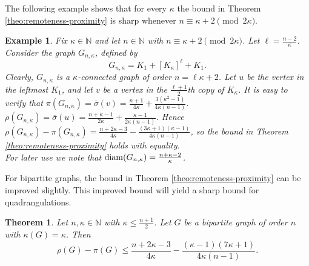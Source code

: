 \documentclass[a4paper,11pt]{article}
\newtheorem{theorem}{Theorem}[section]
\newtheorem{example}{Example}[section]
\begin{document}
The following example shows that for every $\kappa$ the bound in 
Theorem \ref{theo:remoteness-proximity} is sharp whenever $n \equiv \kappa+2 \pmod{2\kappa}$.

\begin{example} \label{ex:rho-pi-connectivity}
Fix $\kappa \in \mathbb{N}$ and let $n \in \mathbb{N}$ with $n \equiv \kappa+2 \pmod{2\kappa}$. 
Let $\ell = \frac{n-2}{\kappa}$. Consider the graph $G_{n, \kappa}$, defined by 
\[ G_{n,\kappa} = K_1 + [K_{\kappa}]^{\ell}  + K_1. \]
Clearly, $G_{n,\kappa}$ is a $\kappa$-connected graph of order $n=\ell \kappa+2$. 
Let $u$ be the vertex in the leftmost $K_1$, and let $v$ be a vertex in the $\frac{\ell+1}{2}$th 
copy of $K_{\kappa}$. It is easy to verify that  
$\pi(G_{n,\kappa}) =\overline{\sigma}(v) = \frac{n+1}{4\kappa} + \frac{3(\kappa^2-1)}{4\kappa(n-1)}$.
$\rho(G_{n,\kappa}) =\overline{\sigma}(u) = \frac{n+\kappa-1}{2\kappa} + \frac{\kappa-1}{2\kappa(n-1)}$.
Hence 
$\rho(G_{n,\kappa}) - \pi(G_{n,\kappa}) 
    = \frac{n+2\kappa-3}{4\kappa} 
              - \frac{(3\kappa+1)(\kappa-1)}{4\kappa (n-1)}$,  
so the bound in Theorem \ref{theo:remoteness-proximity} holds with equality. 
\\
For later use  we note that ${\rm diam}(G_{n,\kappa})=\frac{n+\kappa-2}{\kappa}$. 
\end{example} 

For bipartite graphs, the bound in Theorem \ref{theo:remoteness-proximity} can be improved slightly. 
This improved bound will yield a sharp bound for quadrangulations. 


\begin{theorem}\label{theo:remoteness-proximity-in-bipartite-graphs}
Let $n, \kappa \in \mathbb{N}$ with $\kappa \leq \frac{n+1}{2}$. Let $G$ be a bipartite graph of order 
$n$ with $\kappa(G) = \kappa$. Then
\[
\rho(G) - \pi(G) \leq \frac{n+2\kappa-3}{4\kappa}  
               - \frac{(\kappa-1)(7\kappa+1)}{4\kappa (n-1)}.       \]     
\end{theorem}
\end{document}
